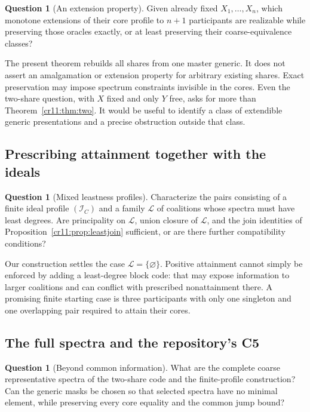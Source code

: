 \documentclass[11pt,letterpaper]{article}
\theoremstyle{plain}
\theoremstyle{definition}
\newtheorem{question}[theorem]{Question}
\theoremstyle{remark}
\numberwithin{equation}{section}
\newcommand{\I}{\mathcal I}
\begin{document}
\begin{question}[An extension property]\label{cr11:q:extension}
Given already fixed $X_1,\ldots,X_n$, which monotone extensions of their
core profile to $n+1$ participants are realizable while preserving those
oracles exactly, or at least preserving their coarse-equivalence classes?
\end{question}

The present theorem rebuilds all shares from one master generic. It does
not assert an amalgamation or extension property for arbitrary existing
shares. Exact preservation may impose spectrum constraints invisible in
the cores. Even the two-share question, with $X$ fixed and only $Y$ free,
asks for more than Theorem~\ref{cr11:thm:two}. It would be useful to identify a
class of extendible generic presentations and a precise obstruction outside
that class.

\subsection{Prescribing attainment together with the ideals}

\begin{question}[Mixed leastness profiles]\label{cr11:q:attainment}
Characterize the pairs consisting of a finite ideal profile $(\I_C)$ and
a family $\mathcal L$ of coalitions whose spectra must have least degrees.
Are principality on $\mathcal L$, union closure of $\mathcal L$, and the
join identities of Proposition~\ref{cr11:prop:leastjoin} sufficient, or are
there further compatibility conditions?
\end{question}

Our construction settles the case $\mathcal L=\{\varnothing\}$. Positive
attainment cannot simply be enforced by adding a least-degree block code:
that may expose information to larger coalitions and can conflict with
prescribed nonattainment there. A promising finite starting case is three
participants with only one singleton and one overlapping pair required to
attain their cores.

\subsection{The full spectra and the repository's C5}

\begin{question}[Beyond common information]\label{cr11:q:spectrum}
What are the complete coarse representative spectra of the two-share code
and the finite-profile construction? Can the generic masks be chosen so
that selected spectra have no minimal element, while preserving every core
equality and the common jump bound?
\end{question}
\end{document}
